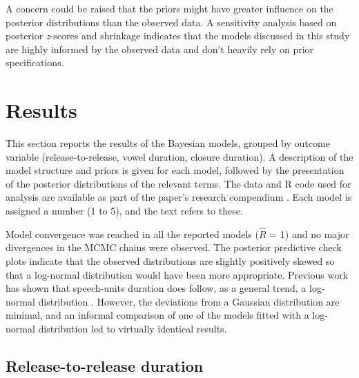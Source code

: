 \documentclass[
  12pt,
  a4paper,
]{article}
\begin{document}
A concern could be raised that the priors might have greater influence
on the posterior distributions than the observed data. A sensitivity
analysis based on posterior \emph{z}-scores and shrinkage
\citep{betancourt2018} indicates that the models discussed in this study
are highly informed by the observed data and don't heavily rely on prior
specifications.

\hypertarget{results}{%
\section{Results}\label{results}}

This section reports the results of the Bayesian models, grouped by
outcome variable (release-to-release, vowel duration, closure duration).
A description of the model structure and priors is given for each model,
followed by the presentation of the posterior distributions of the
relevant terms. The data and R code used for analysis are available as
part of the paper's research compendium \citep{coretta2019b}. Each model
is assigned a number (1 to 5), and the text refers to these.

Model convergence was reached in all the reported models (\(\hat{R}\) =
1) and no major divergences in the MCMC chains were observed. The
posterior predictive check plots indicate that the observed
distributions are slightly positively skewed so that a log-normal
distribution would have been more appropriate. Previous work has shown
that speech-units duration does follow, as a general trend, a log-normal
distribution \citep{rosen2005, ratnikova2017}. However, the deviations
from a Gaussian distribution are minimal, and an informal comparison of
one of the models fitted with a log-normal distribution led to virtually
identical results.

\hypertarget{release-to-release-duration}{%
\subsection{Release-to-release
duration}\label{release-to-release-duration}}

\label{s:rr}
\end{document}
